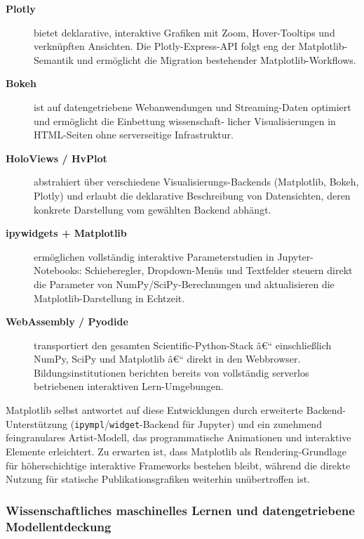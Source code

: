 \documentclass[12pt, a4paper]{article}
\begin{document}
\begin{description}
  \item[\textbf{Plotly}] bietet deklarative, interaktive Grafiken mit
    Zoom, Hover-Tooltips und verknüpften Ansichten. Die Plotly-Express-API
    folgt eng der Matplotlib-Semantik und ermöglicht die Migration
    bestehender Matplotlib-Workflows.

  \item[\textbf{Bokeh}] ist auf datengetriebene Webanwendungen und
    Streaming-Daten optimiert und ermöglicht die Einbettung wissenschaft-
    licher Visualisierungen in HTML-Seiten ohne serverseitige Infrastruktur.

  \item[\textbf{HoloViews / HvPlot}] abstrahiert über verschiedene
    Visualisierungs-Backends (Matplotlib, Bokeh, Plotly) und erlaubt
    die deklarative Beschreibung von Datensichten, deren konkrete
    Darstellung vom gewählten Backend abhängt.

  \item[\textbf{ipywidgets + Matplotlib}] ermöglichen vollständig
    interaktive Parameterstudien in Jupyter-Notebooks: Schieberegler,
    Dropdown-Menüs und Textfelder steuern direkt die Parameter von
    NumPy/SciPy-Berechnungen und aktualisieren die Matplotlib-Darstellung
    in Echtzeit.

  \item[\textbf{WebAssembly / Pyodide}] transportiert den gesamten
    Scientific-Python-Stack â€“ einschließlich NumPy, SciPy und Matplotlib
    â€“ direkt in den Webbrowser. Bildungsinstitutionen berichten bereits
    von vollständig serverlos betriebenen interaktiven Lern-Umgebungen.
\end{description}

Matplotlib selbst antwortet auf diese Entwicklungen durch erweiterte
Backend-Unterstützung (\texttt{ipympl}/\texttt{widget}-Backend für
Jupyter) und ein zunehmend feingranulares Artist-Modell, das programmatische
Animationen und interaktive Elemente erleichtert. Zu erwarten ist, dass
Matplotlib als Rendering-Grundlage für höherschichtige interaktive
Frameworks bestehen bleibt, während die direkte Nutzung für statische
Publikationsgrafiken weiterhin unübertroffen ist.

\subsubsection{Wissenschaftliches maschinelles Lernen und datengetriebene
Modellentdeckung}
\label{subsubsec:sciml}
\end{document}
